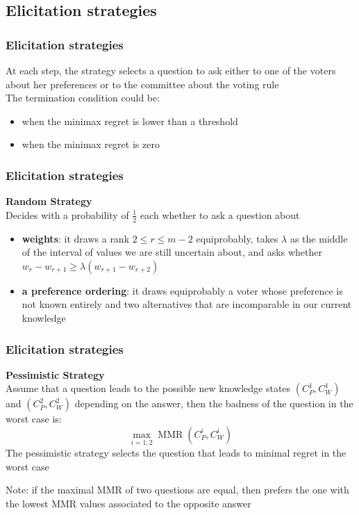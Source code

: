 \documentclass{beamer}
\DeclareMathOperator{\MMR}{MMR}
\begin{document}
	
	\subsection{Elicitation strategies}
	\begin{frame}
		\frametitle{Elicitation strategies}
		At each step, the strategy selects a question to ask either to one of the voters about her preferences or to the committee about the voting rule \\ \bigskip
		\onslide<2-> The termination condition could be:
		\begin{itemize}
			\item <3-> when the minimax regret is lower than a threshold
			\item <4-> when the minimax regret is zero
		\end{itemize}
		\bigskip
	\end{frame}

	\begin{frame}[t]
		\frametitle{Elicitation strategies}
		\textbf{Random Strategy} \\
		\bigskip
		\onslide<2-> Decides with a probability of $\frac{1}{2}$ each whether to ask a question about
		\bigskip
			\begin{itemize}
				\item<3-> \textbf{weights}: it draws a rank $2 \leq r \leq m-2$ equiprobably, takes $\lambda$ as the middle of the interval of values we are still uncertain about, and asks whether $w_{r}-w_{r+1} \geq \lambda (w_{r+1} - w_{r+2})$
				\item<4-> \textbf{a preference ordering}: it draws equiprobably a voter whose preference is not known entirely and two alternatives that are incomparable in our current knowledge
			\end{itemize}
	\end{frame}	
	
	\begin{frame}[t]
		\frametitle{Elicitation strategies}
		\textbf{Pessimistic Strategy} \\
		\bigskip
		\onslide<2-> Assume that a question leads to the possible new knowledge states $(C_P^1, C_W^1)$ and $(C_P^2, C_W^2)$ depending on the answer, then the badness of the question in the worst case is:
		\[\max_{i=1,2} \MMR(C_P^i, C_W^i) \]
		\onslide<3-> The pessimistic strategy selects the question that leads to minimal regret in the worst case \\
		\bigskip
		\onslide<4-> \begin{block}{Note:}
			if the maximal MMR of two questions are equal, then prefers the one with the lowest MMR values associated to the opposite answer
		\end{block}
	\end{frame}	
	
\end{document}
